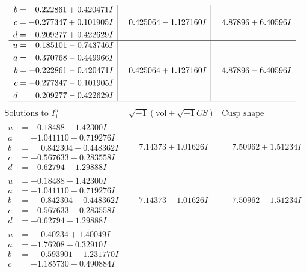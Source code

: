 \documentclass[1p]{elsarticle_modified}
\theoremstyle{definition}
\newcommand{\I}{\sqrt{-1}}
\begin{document}
$$\begin{array}{c|c|c}
\begin{aligned}
b &= -0.222861 + 0.420471 I \\
c &= -0.277347 + 0.101905 I \\
d &= \phantom{-}0.209277 + 0.422629 I\end{aligned}
 & \phantom{-}0.425064 - 1.127160 I & \phantom{-}4.87896 + 6.40596 I \\ \hline\begin{aligned}
u &= \phantom{-}0.185101 - 0.743746 I \\
a &= \phantom{-}0.370768 - 0.449966 I \\
b &= -0.222861 - 0.420471 I \\
c &= -0.277347 - 0.101905 I \\
d &= \phantom{-}0.209277 - 0.422629 I\end{aligned}
 & \phantom{-}0.425064 + 1.127160 I & \phantom{-}4.87896 - 6.40596 I\\
 \hline 
 \end{array}$$\newpage$$\begin{array}{c|c|c}  
\text{Solutions to }I^u_{1}& \I (\text{vol} + \sqrt{-1}CS) & \text{Cusp shape}\\
 \hline 
\begin{aligned}
u &= -0.18488 + 1.42300 I \\
a &= -1.041110 + 0.719276 I \\
b &= \phantom{-}0.842304 - 0.448362 I \\
c &= -0.567633 - 0.283558 I \\
d &= -0.62794 + 1.29888 I\end{aligned}
 & \phantom{-}7.14373 + 1.01626 I & \phantom{-}7.50962 + 1.51234 I \\ \hline\begin{aligned}
u &= -0.18488 - 1.42300 I \\
a &= -1.041110 - 0.719276 I \\
b &= \phantom{-}0.842304 + 0.448362 I \\
c &= -0.567633 + 0.283558 I \\
d &= -0.62794 - 1.29888 I\end{aligned}
 & \phantom{-}7.14373 - 1.01626 I & \phantom{-}7.50962 - 1.51234 I \\ \hline\begin{aligned}
u &= \phantom{-}0.40234 + 1.40049 I \\
a &= -1.76208 - 0.32910 I \\
b &= \phantom{-}0.593901 - 1.231770 I \\
c &= -1.185730 + 0.490884 I \\

\end{aligned}
\end{array}$$
\end{document}
